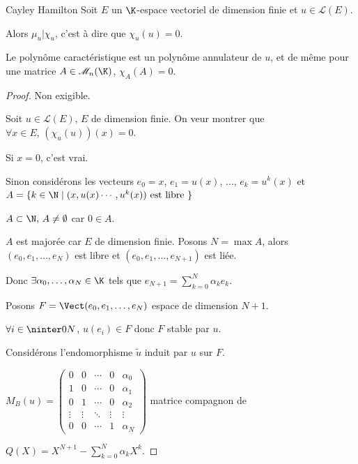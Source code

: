 \begin{theoreme}{Cayley Hamilton}{}
    Soit $E$ un $\K$-espace vectoriel de dimension finie et $u \in \mathscr L(E)$.

    Alors $\mu_u | \chi_u$, c'est à dire que $\chi_u(u) = 0$. 

    Le polynôme caractéristique est un polynôme annulateur de $u$, et de même 
    pour une matrice $A \in \mathscr M_n(\K)$, $\chi_A(A) = 0$.
\end{theoreme}


\begin{proof}
    Non exigible.

    Soit $u \in \mathscr L(E)$, $E$ de dimension finie. On veur montrer que 
    $\forall x \in E, \, (\chi_u(u))(x) = 0$.

    Si $x = 0$, c'est vrai. 

    Sinon considérons les vecteurs $e_0 = x$, $e_1 = u(x)$, $\ldots$, $e_k = u^k(x)$ 
    et $A = \{k \in \N \mid (x, u(x) \cdots, u^k(x)) \text{ est libre }\}$

    $A \subset \N, \, A \neq \emptyset$ car $0 \in A$.

    $A$ est majorée car $E$ de dimension finie. Posons $N = \max A$, alors $(e_0, e_1, \ldots, e_N)$ est libre et
    $(e_0, e_1, \ldots, e_{N + 1})$ est liée.

    Donc $\exists \alpha_0, \ldots, \alpha_N \in \K$ tels que
    $e_{N + 1} = \sum_{k = 0 }^{ N } \alpha_k e_k$.

    Posons $F = \Vect(e_0, e_1, \ldots, e_N)$ espace de dimension $N + 1$. 

    $\forall i \in \ninter 0 N$, $u(e_i) \in F$ donc $F$ stable par $u$.

    Considérons l'endomorphisme $\tilde u $ induit par $u$ sur $F$.

    $M_B(u) = \begin{pmatrix}
        0 & 0 & \cdots & 0 & \alpha_0 \\
        1 & 0 & \cdots & 0 & \alpha_1 \\
        0 & 1 & \cdots & 0 & \alpha_2 \\
        \vdots & \vdots & \ddots & \vdots & \vdots \\
        0 & 0 & \cdots & 1 & \alpha_N
    \end{pmatrix}$ matrice compagnon de 
    
    $\displaystyle Q(X) = X^{N + 1} - \sum_{k = 0 }^{ N } \alpha_k X^k$.


\end{proof}
